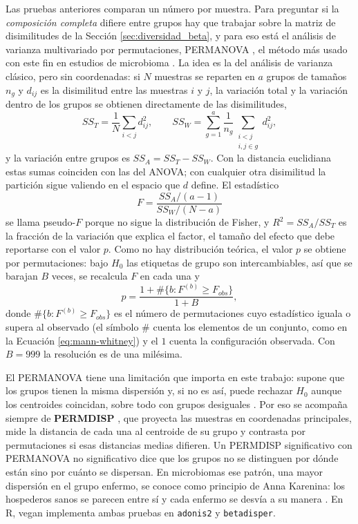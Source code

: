 Las pruebas anteriores comparan un número por muestra. Para preguntar si la \emph{composición
completa} difiere entre grupos hay que trabajar sobre la matriz de disimilitudes de la
Sección \ref{sec:diversidad_beta}, y para eso está el análisis de varianza multivariado por
permutaciones, PERMANOVA \citep{anderson2001new}, el método más usado con este fin en estudios de
microbioma \citep{kleinebardenhorst2021data, aldirawi2023univariate}. La idea es la del análisis de
varianza clásico, pero sin coordenadas: si $N$ muestras se reparten en $a$ grupos de tamaños $n_g$ y
$d_{ij}$ es la disimilitud entre las muestras $i$ y $j$, la variación total y la variación dentro de
los grupos se obtienen directamente de las disimilitudes,
\begin{equation}
SS_T = \frac{1}{N} \sum_{i<j} d_{ij}^{2}, \qquad
SS_W = \sum_{g=1}^{a} \frac{1}{n_g} \sum_{\substack{i<j \\ i,j \in g}} d_{ij}^{2},
\label{eq:permanova-ss}
\end{equation}
y la variación entre grupos es $SS_A = SS_T - SS_W$. Con la distancia euclidiana estas sumas
coinciden con las del ANOVA; con cualquier otra disimilitud la partición sigue valiendo en el espacio
que $d$ define. El estadístico
\begin{equation}
F = \frac{SS_A / (a-1)}{SS_W / (N-a)}
\label{eq:pseudo-f}
\end{equation}
se llama pseudo-$F$ porque no sigue la distribución de Fisher, y $R^2 = SS_A / SS_T$ es la fracción
de la variación que explica el factor, el tamaño del efecto que debe reportarse con el valor $p$.
Como no hay distribución teórica, el valor $p$ se obtiene por permutaciones: bajo $H_0$ las etiquetas
de grupo son intercambiables, así que se barajan $B$ veces, se recalcula $F$ en cada una y
\begin{equation}
p = \frac{1 + \#\{b : F^{(b)} \geq F_{obs}\}}{1 + B},
\label{eq:p-permutacion}
\end{equation}
donde $\#\{b : F^{(b)} \geq F_{obs}\}$ es el número de permutaciones cuyo estadístico iguala o
supera al observado (el símbolo $\#$ cuenta los elementos de un conjunto, como en la
Ecuación \ref{eq:mann-whitney}) y el $1$ cuenta la configuración observada. Con $B = 999$ la
resolución es de una milésima.

El PERMANOVA tiene una limitación que importa en este trabajo: supone que los grupos tienen la misma
dispersión y, si no es así, puede rechazar $H_0$ aunque los centroides coincidan, sobre todo con
grupos desiguales \citep{anderson2001new, kleinebardenhorst2021data}. Por eso se acompaña siempre de
\textbf{PERMDISP} \citep{anderson2006distance}, que proyecta las muestras en coordenadas principales,
mide la distancia de cada una al centroide de su grupo y contrasta por permutaciones si esas
distancias medias difieren. Un PERMDISP significativo con PERMANOVA no significativo dice que los
grupos no se distinguen por dónde están sino por cuánto se dispersan. En microbiomas ese patrón, una
mayor dispersión en el grupo enfermo, se conoce como principio de Anna Karenina: los hospederos sanos
se parecen entre sí y cada enfermo se desvía a su manera \citep{zaneveld2017stress, li2026anna}. En R,
vegan \citep{oksanen2022vegan} implementa ambas pruebas en \texttt{adonis2} y \texttt{betadisper}.

